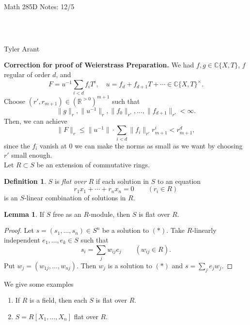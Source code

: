 \documentclass[12pt]{article}
\theoremstyle{theorem}            %
\theoremstyle{definition}           %
\newtheorem{definition}[theorem]{Definition}
\newtheorem{lemma}[theorem]{Lemma}
\theoremstyle{empty}
\begin{document}
\tikzset{node distance=2cm, auto}

\begin{center} \begin{Large} Math 285D Notes: 12/5 \end{Large}\\
\text{} \\
\begin{large} Tyler Arant  \end{large}
\end{center}

\textbf{Correction for proof of Weierstrass Preparation.} We had $f, g\in \mathds{C}\{X, T\}$, $f$ regular of order $d$, and
$$F=u^{-1}\sum_{i<d}f_iT^i, \quad u=f_d + f_{d+1}T+ \cdots \in \mathds{C}\{X, T\}^\times.$$
Choose $(r', r_{m+1})\in (\mathds{R}^{>0})^{m+1}$ such that
$$\|g\|_r, \|u^{-1}\|_r, \|f_0\|_{r'}, \dots, \|f_{d+1}\|_{r'}<\infty.$$
Then, we can achieve
$$\|F\|_r\leq \|u^{-1}\|\cdot \sum_{i<d}\|f_i\|_{r'}r^i_{m+1}<r^d_{m+1},$$
since the $f_i$ vanish at $0$ we can make the norms as small as we want by choosing $r'$ small enough.\\

Let $R\subset S$ be an extension of commutative rings.

\begin{definition} $S$ is \textit{flat over} $R$ if each solution in $S$ to an equation
\begin{equation} r_1x_1+\cdots + r_n x_n=0 \qquad (r_i\in R) \tag{$*$}\end{equation}
is an $S$-linear combination of solutions in $R$. \end{definition}

\begin{lemma} If $S$ free as an $R$-module, then $S$ is flat over $R$. \end{lemma}

\begin{proof} Let $s=(s_1, \dots, s_n)\in S^n$ be a solution to $(*)$.  Take $R$-linearly independent $e_1, \dots, e_k\in S$ such that
$$s_i=\sum_j w_{ij} e_j \qquad (w_{ij}\in R).$$
Put $w_j=(w_{1j}, \dots, w_{nj})$.  Then $w_j$ is a solution to $(*)$ and $s=\sum_j e_jw_j.$
\end{proof}

We give some examples
\begin{enumerate}[$\bullet$]
\item If $R$ is a field, then each $S$ is flat over $R$.  
\item $S=R[X_1, \dots, X_n]$ flat over $R$.
\end{enumerate}
\end{document}
